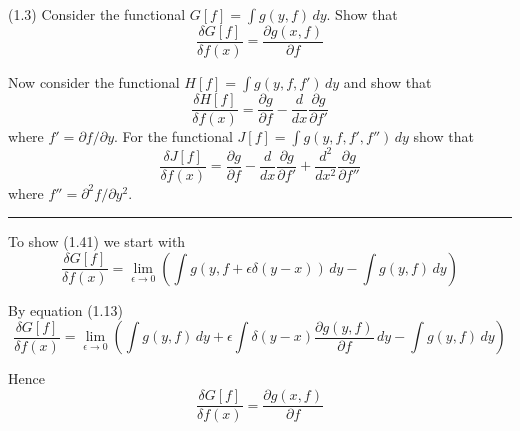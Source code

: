 \documentclass[12pt]{article}
\begin{document}
(1.3)
Consider the functional $G[f]=\int g(y,f)\,dy$.
Show that
\begin{equation*}
\frac{\delta G[f]}{\delta f(x)}=\frac{\partial g(x,f)}{\partial f}
\tag{1.41}
\end{equation*}

Now consider the functional $H[f]=\int g(y,f,f')\,dy$
and show that
\begin{equation*}
\frac{\delta H[f]}{\delta f(x)}=\frac{\partial g}{\partial f}
-\frac{d}{dx}\frac{\partial g}{\partial f'}
\tag{1.42}
\end{equation*}
where $f'=\partial f/\partial y$.
For the functional $J[f]=\int g(y,f,f',f'')\,dy$ show that
\begin{equation*}
\frac{\delta J[f]}{\delta f(x)}
=\frac{\partial g}{\partial f}
-\frac{d}{dx}\frac{\partial g}{\partial f'}
+\frac{d^2}{dx^2}\frac{\partial g}{\partial f''}
\tag{1.43}
\end{equation*}
where $f''=\partial^2 f/\partial y^2$.

\bigskip
\hrule

\bigskip
To show (1.41) we start with
\begin{equation*}
\frac{\delta G[f]}{\delta f(x)}
=\lim_{\epsilon\rightarrow 0}\left(
\int g(y,f+\epsilon\delta(y-x))\,dy-\int g(y,f)\,dy
\right)
\end{equation*}

By equation (1.13)
\begin{equation*}
\frac{\delta G[f]}{\delta f(x)}
=\lim_{\epsilon\rightarrow 0}
\left(
\int g(y,f)\,dy
+\epsilon\int\delta(y-x)\frac{\partial g(y,f)}{\partial f}\,dy
-\int g(y,f)\,dy
\right)
\end{equation*}

Hence
\begin{equation*}
\frac{\delta G[f]}{\delta f(x)}=\frac{\partial g(x,f)}{\partial f}
\end{equation*}
\end{document}
